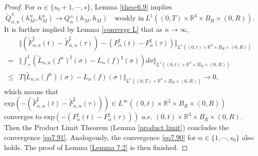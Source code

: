\documentclass[reqno,11pt]{amsart}
\numberwithin{equation}{section}
\def\R{\mathbb{R}}
\def\exp{\mathrm{exp}}
\begin{document}
\begin{proof}
For $\alpha \in \{s_0+1,\cdots,s\}$, Lemma \ref{theo-6.9} implies
	\begin{equation*}
		\tilde{Q}^\pm_{\alpha ,n} (h^n_{M},h^n_{M}) \to Q^\pm _\alpha (h_{M}, h_{M} ) \quad \text{weakly in}\ L^1((0,T)\times \R^3 \times B_R \times (0,R)).
	\end{equation*}
It is further implied by Lemma \ref{converge L} that as $n\rightarrow \infty$,
	\begin{equation*}
		\begin{aligned}
			&\Vert (\tilde{F}^\sharp _{\alpha ,n} (t)-\tilde{F}^\sharp _{\alpha ,n} (\tau)) - (F^\sharp _{\alpha } (t)-F^\sharp _{\alpha} (\tau)) \Vert_{L^1((0,t)\times \R^3 \times B_R \times (0,R))} \\
			= &\Vert \int_{\tau}^{t}(\tilde{L}_{\alpha ,n} (f^n) ^\sharp (\sigma) -L_{\alpha } (f) ^\sharp (\sigma))  d\sigma \Vert_{L^1((0,t)\times \R^3 \times B_R \times (0,R))} \\
			\leq & T \Vert \tilde{L}_{\alpha ,n} (f^n)  (\sigma) -L_{\alpha } (f) (\sigma) \Vert_{L^1((0,T)\times \R^3 \times B_R \times (0,R))} \rightarrow 0 ,
		\end{aligned}
	\end{equation*}
which means that $\exp(-(\tilde{F}^\sharp _{\alpha ,n} (t)-\tilde{F}^\sharp _{\alpha ,n} (\tau))) \in  L^\infty ( (0, t) \times \R^3 \times B_R \times (0, R) )$ converges to $\exp(-(F^\sharp _{\alpha } (t)-F^\sharp _{\alpha} (\tau)))$ $a.e.$ $(0,t)\times \R^3 \times B_R \times (0,R)$. Then the Product Limit Theorem (Lemma \ref{product limit}) concludes the convergence \eqref{eq7.91}. Analogously, the convergence \eqref{eq7.90} for $\alpha \in \{1,\cdots,s_0\}$ also holds. The proof of Lemma \ref{Lemma 7.2} is then finished.
\end{proof}
\end{document}

